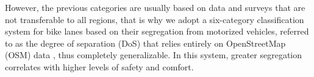 \documentclass[lettersize,journal]{IEEEtran}
\begin{document}

However, the previous categories are usually based on data and surveys that are not transferable to all regions, that is why we adopt a six-category classification system for bike lanes based on their segregation from motorized vehicles, referred to as the degree of separation (DoS)  that relies entirely on OpenStreetMap (OSM) data \cite{2024graphbased}, thus completely generalizable. In this system, greater segregation correlates with higher levels of safety and comfort. 



\end{document}
